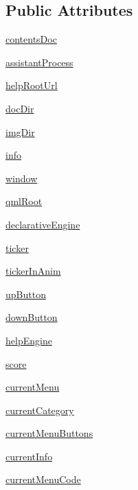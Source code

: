 \subsection*{Public Attributes}
\begin{DoxyCompactItemize}
\item 
\hyperlink{classmenumanager_1_1MenuManager_a359abd80c687b3b44fd2a985446179bc}{contents\+Doc}
\item 
\hyperlink{classmenumanager_1_1MenuManager_aa3910bf16c7ad310de8be8a0a859f9e4}{assistant\+Process}
\item 
\hyperlink{classmenumanager_1_1MenuManager_abcb5e7cd8b42f81ec9b160c94d216c42}{help\+Root\+Url}
\item 
\hyperlink{classmenumanager_1_1MenuManager_ab04f8c5e010864ffc875b600fe1d655c}{doc\+Dir}
\item 
\hyperlink{classmenumanager_1_1MenuManager_aadacc02dfe5db8a92bd155870b7ee46d}{img\+Dir}
\item 
\hyperlink{classmenumanager_1_1MenuManager_aae78129757983b52a29c3f0b37bc9437}{info}
\item 
\hyperlink{classmenumanager_1_1MenuManager_a5321154e44dbe3b5726a100768be6ecb}{window}
\item 
\hyperlink{classmenumanager_1_1MenuManager_aa4fd6cfcff7ebc741806d531c0b8c92d}{qml\+Root}
\item 
\hyperlink{classmenumanager_1_1MenuManager_ae87d1e2cd99fee4b6a9055d1a73e7edf}{declarative\+Engine}
\item 
\hyperlink{classmenumanager_1_1MenuManager_a81f841890a86af8820f1ba932838c2f2}{ticker}
\item 
\hyperlink{classmenumanager_1_1MenuManager_acd8516655b835c4d1556ea81e9a4ef97}{ticker\+In\+Anim}
\item 
\hyperlink{classmenumanager_1_1MenuManager_a181e595fcfd6cb6ec615171024df6901}{up\+Button}
\item 
\hyperlink{classmenumanager_1_1MenuManager_ab3da42f5cebb93647b88a22d29892d67}{down\+Button}
\item 
\hyperlink{classmenumanager_1_1MenuManager_a7a4bbfec6dab27f31f7ff9922b8b262e}{help\+Engine}
\item 
\hyperlink{classmenumanager_1_1MenuManager_a00d81c5f105546331e66f315266f7d68}{score}
\item 
\hyperlink{classmenumanager_1_1MenuManager_a86e87ff909685a6618f4625b3b923336}{current\+Menu}
\item 
\hyperlink{classmenumanager_1_1MenuManager_a248c4d2bddeced6bbe4e102a67e6d2eb}{current\+Category}
\item 
\hyperlink{classmenumanager_1_1MenuManager_aa99493ea057cbfd02fdbcd949d991d47}{current\+Menu\+Buttons}
\item 
\hyperlink{classmenumanager_1_1MenuManager_aa412b98a92733943258fa7bbebb278b6}{current\+Info}
\item 
\hyperlink{classmenumanager_1_1MenuManager_a690945d624125dce4f04ddc2c9478ae2}{current\+Menu\+Code}
\end{DoxyCompactItemize}
